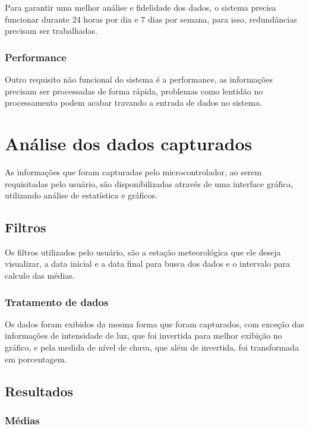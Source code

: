 Para garantir uma melhor análise e fidelidade dos dados, o sistema precisa funcionar durante 24 horas por dia e 7 dias por semana, para isso, redundâncias precisam ser trabalhadas.

\subsection{Performance}

Outro requisito não funcional do sistema é a performance, as informações precisam ser processadas de forma rápida, problemas como lentidão no processamento podem acabar travando a entrada de dados no sistema.

\chapter{Análise dos dados capturados}

As informações que foram capturadas pelo microcontrolador, ao serem requisitadas pelo usuário, são disponibilizadas através de uma interface gráfica, utilizando análise de estatística e gráficos.

\section{Filtros}

Os filtros utilizados pelo usuário, são a estação meteorológica que ele deseja visualizar, a data inicial e a data final para busca dos dados e o intervalo para calculo das médias.

\subsection{Tratamento de dados}

Os dados foram exibidos da mesma forma que foram capturados, com exceção das informações de intensidade de luz, que foi invertida para melhor exibição no gráfico, e pela medida de nível de chuva, que além de invertida, foi transformada em porcentagem.

\section{Resultados}

\subsection{Médias}

